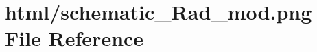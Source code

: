 \hypertarget{html_2schematic___rad__mod_8png}{}\section{html/schematic\+\_\+\+Rad\+\_\+mod.png File Reference}
\label{html_2schematic___rad__mod_8png}
